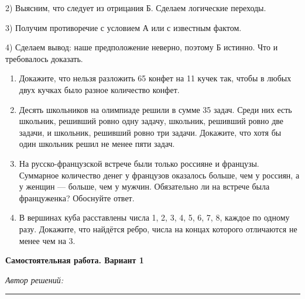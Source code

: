 2) Выясним, что следует из отрицания Б. Сделаем логические переходы.

3) Получим противоречие с условием А или с известным фактом.

4) Сделаем вывод: наше предположение неверно, поэтому Б истинно. Что и требовалось доказать.

\begin{enumerate}[start=2,itemsep=0.8em]
    \item Докажите, что нельзя разложить 65 конфет на 11 кучек так, чтобы в любых двух кучках было разное количество конфет.

    \item Десять школьников на олимпиаде решили в сумме 35 задач. Среди них есть школьник, решивший ровно одну задачу, школьник, решивший ровно две задачи, и школьник, решивший ровно три задачи. Докажите, что хотя бы один школьник решил не менее пяти задач.

    \item На русско-французской встрече были только россияне и французы. Суммарное количество денег у французов оказалось больше, чем у россиян, а у женщин --- больше, чем у мужчин. Обязательно ли на встрече была француженка? Обоснуйте ответ.

    \item В вершинах куба расставлены числа 1, 2, 3, 4, 5, 6, 7, 8, каждое по одному разу. Докажите, что найдётся ребро, числа на концах которого отличаются не менее чем на 3.
\end{enumerate}

\newpage

\begin{center}
    \large\textbf{Самостоятельная работа. Вариант 1}
\end{center}

\textit{Автор решений:} \rule{6cm}{0.4pt}

